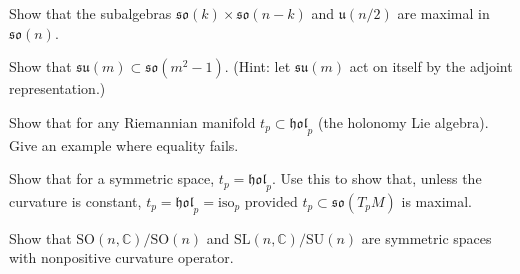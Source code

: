 \begin{remark}
  \label{rem:pet-ch10-exercise-maximal-subalgebras-son}
  Show that the subalgebras $\mathfrak{so}(k)\times\mathfrak{so}(n-k)$ and
  $\mathfrak u(n/2)$ are maximal in $\mathfrak{so}(n)$.
\end{remark}

\begin{remark}
  \label{rem:pet-ch10-exercise-sum-in-so}
  Show that $\mathfrak{su}(m)\subset\mathfrak{so}(m^2-1)$. (Hint: let
  $\mathfrak{su}(m)$ act on itself by the adjoint representation.)
\end{remark}

\begin{remark}
  \label{rem:pet-ch10-exercise-tp-subset-holp}
  Show that for any Riemannian manifold $t_p\subset\mathfrak{hol}_p$ (the
  holonomy Lie algebra). Give an example where equality fails.
\end{remark}

\begin{remark}[$t_p=\mathfrak{hol}_p$ for symmetric spaces]
  \label{rem:pet-ch10-exercise-tp-equals-holp-symmetric}
  Show that for a symmetric space, $t_p=\mathfrak{hol}_p$. Use this to show
  that, unless the curvature is constant, $t_p=\mathfrak{hol}_p=\mathrm{iso}_p$
  provided $t_p\subset\mathfrak{so}(T_pM)$ is maximal.
\end{remark}

\begin{remark}
  \label{rem:pet-ch10-exercise-son-c-sln-c-symmetric}
  Show that $\mathrm{SO}(n,\mathbb C)/\mathrm{SO}(n)$ and
  $\mathrm{SL}(n,\mathbb C)/\mathrm{SU}(n)$ are symmetric spaces with nonpositive
  curvature operator.
\end{remark}

